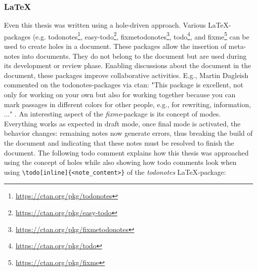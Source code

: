 \subsubsection{\LaTeX}
Even this thesis was written using a hole-driven approach.
Various \LaTeX-packages (e.g. todonotes\footnote{\url{https://ctan.org/pkg/todonotes}}, easy-todo\footnote{\url{https://ctan.org/pkg/easy-todo}}, fixmetodonotes\footnote{\url{https://ctan.org/pkg/fixmetodonotes}}, todo\footnote{\url{https://ctan.org/pkg/todo}}, and fixme\footnote{\url{https://ctan.org/pkg/fixme}} can be used to create holes in a document.
These packages allow the insertion of meta-notes into documents.
They do not belong to the document but are used during its development or review phase.
Enabling discussions about the document in the document, these packages improve collaborative activities.
E.g., Martin Dagleish commented on the todonotes-packages via ctan: "This package is excellent, not only for working on your own but also for working together because you can mark passages in different colors for other people, e.g., for rewriting, information, ..." \cite{dagleish_comment_2021}.
An interesting aspect of the \emph{fixme}-package is its concept of modes.
Everything works as expected in draft mode, once final mode is activated, the behavior changes: remaining notes now generate errors, thus breaking the build of the document and indicating that these notes must be resolved to finish the document.
The following todo comment explains how this thesis was approached using the concept of holes while also showing how todo comments look when using \verb|\todo[inline]{<note_content>}| of the \emph{todonotes} \LaTeX-package:

\vspace{3mm}


